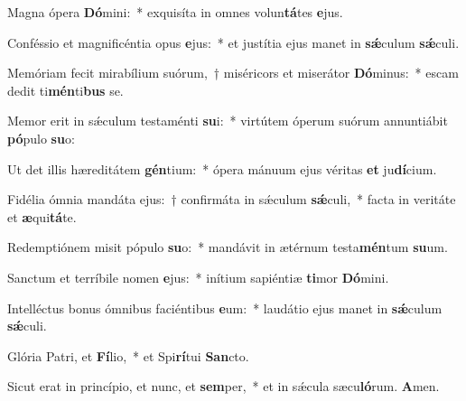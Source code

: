 \item Magna ópera \textbf{Dó}mini:~* exquisíta in omnes volun\textbf{tá}tes \textbf{e}jus.
\item Conféssio et magnificéntia opus \textbf{e}jus:~* et justítia ejus manet in \textbf{sǽ}culum \textbf{sǽ}culi.
\item Memóriam fecit mirabílium suórum,~† miséricors et miserátor \textbf{Dó}minus:~* escam dedit ti\textbf{mén}ti\textbf{bus} se.
\item Memor erit in sǽculum testaménti \textbf{su}i:~* virtútem óperum suórum annuntiábit \textbf{pó}pulo \textbf{su}o:
\item Ut det illis hæreditátem \textbf{gén}tium:~* ópera mánuum ejus véritas \textbf{et} ju\textbf{dí}cium.
\item Fidélia ómnia mandáta ejus:~† confirmáta in sǽculum \textbf{sǽ}culi,~* facta in veritáte et \textbf{æ}qui\textbf{tá}te.
\item Redemptiónem misit pópulo \textbf{su}o:~* mandávit in ætérnum testa\textbf{mén}tum \textbf{su}um.
\item Sanctum et terríbile nomen \textbf{e}jus:~* inítium sapiéntiæ \textbf{ti}mor \textbf{Dó}mini.
\item Intelléctus bonus ómnibus faciéntibus \textbf{e}um:~* laudátio ejus manet in \textbf{sǽ}culum \textbf{sǽ}culi.
\item Glória Patri, et \textbf{Fí}lio,~* et Spi\textbf{rí}tui \textbf{San}cto.
\item Sicut erat in princípio, et nunc, et \textbf{sem}per,~* et in sǽcula sæcu\textbf{ló}rum. \textbf{A}men.
